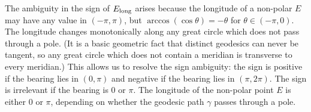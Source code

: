 \documentclass[12pt]{article}
\renewcommand\long[1]{{#1}_{\rm long}}
\begin{document}
The ambiguity in the sign of $\long E$ arises because the longitude of a
non-polar $E$ may have any value in $(-\pi, \pi)$, but
$\arccos(\cos\theta) = -\theta$ for $\theta\in(-\pi,0)$.  The longitude changes
monotonically along any great circle which does not pass through a pole.  (It is
a basic geometric fact that distinct geodesics can never be tangent, so any
great circle which does not contain a meridian is transverse to every meridian.)
This allows us to resolve the sign ambiguity: the sign is positive if the
bearing lies in $(0, \pi)$ and negative if the bearing lies in $(\pi, 2\pi)$.
The sign is irrelevant if the bearing is $0$ or $\pi$. The longitude of the
non-polar point $E$ is either $0$ or $\pi$, depending on whether the geodesic
path $\gamma$ passes through a pole.
\end{document}
